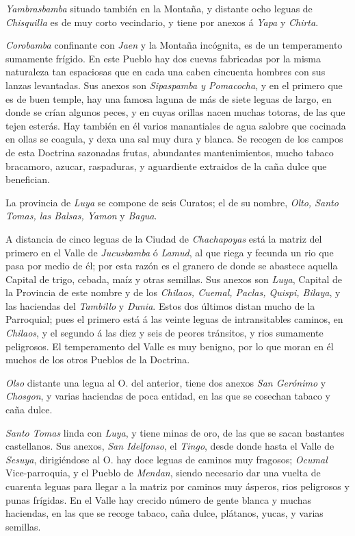 \documentclass[12pt,a4paper]{article}
\begin{document}
\emph{Yambrasbamba} situado también en la Montaña, y distante ocho leguas de \emph{Chisquilla} es de muy corto vecindario, y tiene por anexos á \emph{Yapa} y \emph{Chirta}.

\emph{Corobamba} confinante con \emph{Jaen} y la Montaña incógnita, es de un temperamento sumamente frígido. En este Pueblo hay dos cuevas fabricadas por la misma naturaleza tan espaciosas que en cada una caben cincuenta hombres con sus lanzas levantadas. Sus anexos son \emph{Sipaspamba y Pomacocha}, y en el primero que es de buen temple, hay una famosa laguna de más de siete leguas de largo, en donde se crían algunos peces, y en cuyas orillas nacen muchas totoras, de las que tejen esterás. Hay también en él varios manantiales de agua salobre que cocinada en ollas se coagula, y dexa una sal muy dura y blanca. Se recogen de los campos de esta Doctrina sazonadas frutas, abundantes mantenimientos, mucho tabaco bracamoro, azucar, raspaduras, y aguardiente extraidos de la caña dulce que benefician.

La provincia de \emph{Luya} se compone de seis Curatos; el de su nombre, \emph{Olto, Santo Tomas, las Balsas, Yamon} y \emph{Bagua}.

A distancia de cinco leguas de la Ciudad de \emph{Chachapoyas} está la matriz del primero en el Valle de \emph{Jucusbamba} ó \emph{Lamud}, al que riega y fecunda un rio que pasa por medio de él; por esta razón es el granero de donde se abastece aquella Capital de trigo, cebada, maíz y otras semillas. Sus anexos son \emph{Luya}, Capital de la Provincia de este nombre y de los \emph{Chilaos, Cuemal, Paclas, Quispi, Bilaya}, y las haciendas del \emph{Tambillo} y \emph{Dunia}. Estos dos últimos distan mucho de la Parroquial; pues el primero está á las veinte leguas de intransitables caminos, en \emph{Chilaos}, y el segundo á las diez y seis de peores tránsitos, y rios sumamente peligrosos. El temperamento del Valle es muy benigno, por lo que moran en él muchos de los otros Pueblos de la Doctrina.

\emph{Olso} distante una legua al O. del anterior, tiene dos anexos \emph{San Gerónimo} y \emph{Chosgon}, y varias haciendas de poca entidad, en las que se cosechan tabaco y caña dulce. 

\emph{Santo Tomas} linda con \emph{Luya}, y tiene minas de oro, de las que se sacan bastantes castellanos. Sus anexos, \emph{San Idelfonso}, el \emph{Tingo}, desde donde hasta el Valle de \emph{Sesuya}, dirigiéndose al O. hay doce leguas de caminos muy fragosos; \emph{Ocumal} Vice-parroquia, y el Pueblo de \emph{Mendan}, siendo necesario dar una vuelta de cuarenta leguas para llegar a la matriz por caminos muy ásperos, rios peligrosos y punas frígidas. En el Valle hay crecido número de gente blanca y muchas haciendas, en las que se recoge tabaco, caña dulce, plátanos, yucas, y varias semillas.
\end{document}
